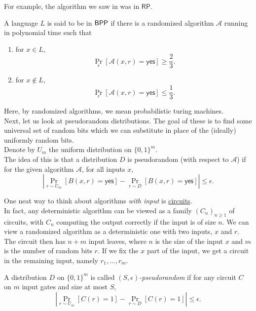 		For example, the algorithm we saw in  was in $\mathsf{RP}$.

		\begin{fdef}[$\BPP$]
			A language $L$ is said to be in $\BPP$ if there is a randomized algorithm $\mathcal{A}$ running in polynomial time such that
			\begin{enumerate}
				\item for $x \in L$,
				\[ \Pr_{r} \left[\mathcal{A}(x,r) = \mathsf{yes}\right] \ge \frac{2}{3}. \]
				\item for $x \not\in L$,
				\[ \Pr_{r} \left[\mathcal{A}(x,r) = \mathsf{yes}\right] \le \frac{1}{3}. \]
			\end{enumerate}
		\end{fdef}
		
		Here, by randomized algorithms, we mean probabilistic turing machines.\\

		Next, let us look at pseudorandom distributions. The goal of these is to find some universal set of random bits which we can substitute in place of the (ideally) uniformly random bits. \\
		Denote by $U_m$ the uniform distribution on $\{0,1\}^m$.\\
		The idea of this is that a distribution $D$ is pseudorandom (with respect to $\mathcal{A}$) if for the given algorithm $\mathcal{A}$, for all inputs $x$,
		\[ \left| \Pr_{r \sim U_m}[ B(x,r) = \mathsf{yes}] - \Pr_{r \sim D}[ B(x,r) = \mathsf{yes} ] \right| \le \epsilon. \]

		One neat way to think about algorithms \emph{with input} is \href{https://en.wikipedia.org/wiki/Boolean_circuit}{circuits}.\\
		In fact, any deterministic algorithm can be viewed as a family $(C_n)_{n \ge 1}$ of circuits, with $C_n$ computing the output correctly if the input is of size $n$. We can view a randomized algorithm as a deterministic one with two inputs, $x$ and $r$. The circuit then has $n+m$ input leaves, where $n$ is the size of the input $x$ and $m$ is the number of random bits $r$. If we fix the $x$ part of the input, we get a circuit in the remaining input, namely $r_1,\ldots,r_m$.

		\begin{fdef}
			A distribution $D$ on $\{0,1\}^m$ is called \emph{$(S,\epsilon)$-pseudorandom} if for any circuit $C$ on $m$ input gates and size at most $S$,
			\[ \left| \Pr_{r \sim U_m} [ C(r) = 1 ] - \Pr_{r \sim D} [C(r) = 1] \right| \le \epsilon. \]
		\end{fdef}

